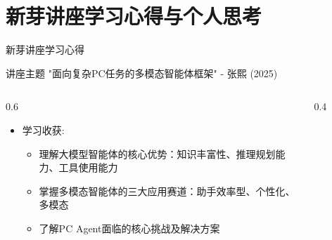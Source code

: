 \documentclass{beamer}
\begin{document}
\section{新芽讲座学习心得与个人思考}
\begin{frame}{新芽讲座学习心得}
    \begin{block}{讲座主题}
        "面向复杂PC任务的多模态智能体框架" - 张熙 (2025)
    \end{block}
    
    \begin{columns}
        \begin{column}{0.6\textwidth}
            \begin{itemize}
                \item 学习收获:
                \begin{itemize}
                    \item 理解大模型智能体的核心优势：知识丰富性、推理规划能力、工具使用能力
                    \item 掌握多模态智能体的三大应用赛道：助手效率型、个性化、多模态
                    \item 了解PC Agent面临的核心挑战及解决方案
                \end{itemize}
            \end{itemize}
        \end{column}
        \begin{column}{0.4\textwidth}
            \begin{figure}
            \end{figure}
        \end{column}
    \end{columns}
\end{frame}
\end{document}
